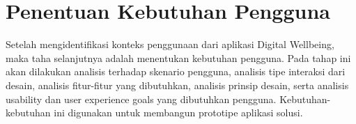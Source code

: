 \newcommand{\cccnormspacing}{\baselineskip=12pt}
\newcommand{\cccnormspacingcenter}{\centering\arraybackslash\cccnormspacing}


\section{Penentuan Kebutuhan Pengguna}

Setelah mengidentifikasi konteks penggunaan dari aplikasi Digital Wellbeing, maka taha selanjutnya adalah menentukan kebutuhan pengguna. Pada tahap ini akan dilakukan analisis terhadap skenario pengguna, analisis tipe interaksi dari desain, analisis fitur-fitur yang dibutuhkan, analisis prinsip desain, serta analisis usability dan user experience goals yang dibutuhkan pengguna. Kebutuhan-kebutuhan ini digunakan untuk membangun prototipe aplikasi solusi.

